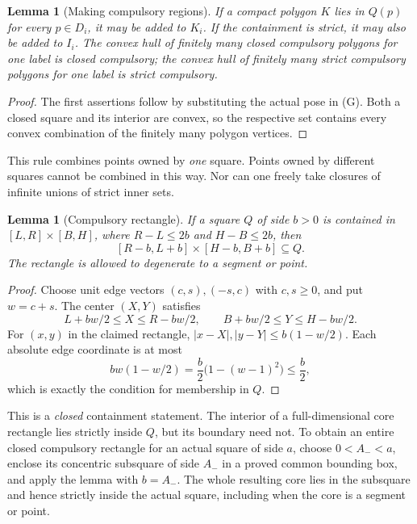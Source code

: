 \documentclass[11pt]{article}
\newtheorem{lemma}[theorem]{Lemma}
\begin{document}
\begin{lemma}[Making compulsory regions]\label{lem:compulsory-hulls}
If a compact polygon $K$ lies in $Q(p)$ for every $p\in D_i$, it may be
added to $K_i$.  If the containment is strict, it may also be added to $I_i$.
The convex hull of finitely many closed compulsory polygons for one label
is closed compulsory; the convex hull of finitely many strict compulsory
polygons for one label is strict compulsory.
\end{lemma}

\begin{proof}
The first assertions follow by substituting the actual pose in (G).
Both a closed square and its interior are convex, so the respective set
contains every convex combination of the finitely many polygon vertices.
\end{proof}

This rule combines points owned by \emph{one} square.  Points owned by
different squares cannot be combined in this way.  Nor can one freely
take closures of infinite unions of strict inner sets.

\begin{lemma}[Compulsory rectangle]\label{lem:compulsory-rectangle}
If a square $Q$ of side $b>0$ is contained in
$[L,R]\times[B,H]$, where $R-L\leq2b$ and $H-B\leq2b$, then
\[
 [R-b,L+b]\times[H-b,B+b]\subseteq Q.
\]
The rectangle is allowed to degenerate to a segment or point.
\end{lemma}

\begin{proof}
Choose unit edge vectors $(c,s),(-s,c)$ with $c,s\geq0$, and put $w=c+s$.
The center $(X,Y)$ satisfies
\[
 L+bw/2\leq X\leq R-bw/2,\qquad
 B+bw/2\leq Y\leq H-bw/2.
\]
For $(x,y)$ in the claimed rectangle,
$|x-X|,|y-Y|\leq b(1-w/2)$.  Each absolute edge coordinate is at most
\[
 bw(1-w/2)=\frac b2\bigl(1-(w-1)^2\bigr)\leq\frac b2,
\]
which is exactly the condition for membership in $Q$.
\end{proof}

This is a \emph{closed} containment statement.  The interior of a
full-dimensional core rectangle lies strictly inside $Q$, but its boundary
need not.  To obtain an entire closed compulsory rectangle for an actual
square of side $a$, choose $0<A_-<a$, enclose its concentric subsquare of
side $A_-$ in a proved common bounding box, and apply the lemma with
$b=A_-$.  The whole resulting core lies in the subsquare and hence strictly
inside the actual square, including when the core is a segment or point.
\end{document}
